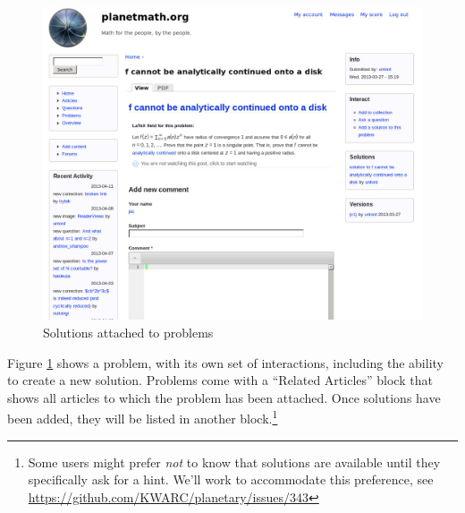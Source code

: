 \newpage
\FloatBarrier

\begin{vplace}[0.7]
\begin{figure}[h]
\begin{center}
\includegraphics[width=.85\textwidth]{./inputs/ProblemOne.png}
\end{center}
\caption{Solutions attached to problems \label{ProblemOne}}
\end{figure}
\bigskip

Figure \ref{ProblemOne} shows a problem, with its own set of
interactions, including the ability to create a new solution.
Problems come with a ``Related Articles'' block that shows all
articles to which the problem has been attached.  Once solutions have
been added, they will be listed in another block.\footnote{Some users
  might prefer \emph{not} to know that solutions are available until
  they specifically ask for a hint.  We'll work to accommodate this
  preference, see \url{https://github.com/KWARC/planetary/issues/343}}
\end{vplace}

\newpage
\FloatBarrier

